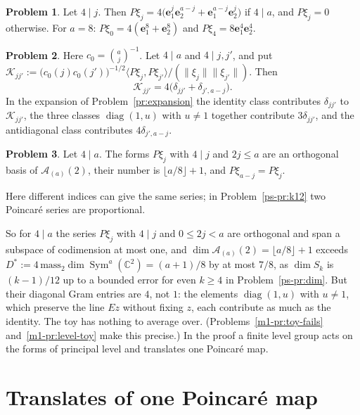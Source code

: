 \documentclass[reqno]{amsart}
\theoremstyle{definition}
\newtheorem{problem}{Problem}[section]
\theoremstyle{plain}
\theoremstyle{remark}
\newcommand{\C}{{\mathbb{C}}}
\newcommand{\Ac}{\mathcal A}
\newcommand{\Kc}{\mathcal K}
\newcommand{\be}{\mathbf e}
\newcommand{\Sym}{\operatorname{Sym}}
\newcommand{\diag}{\operatorname{diag}}
\begin{document}
\begin{problem}\label{pr:Pj}
Let \(4\mid j\).  Then \(P\xi_j=4\bigl(\be_1^j\be_2^{a-j}+\be_1^{a-j}\be_2^j\bigr)\) if \(4\mid a\), and \(P\xi_j=0\) otherwise.  For \(a=8\): \(P\xi_0=4(\be_1^8+\be_2^8)\) and \(P\xi_4=8\be_1^4\be_2^4\).
\end{problem}

\begin{problem}\label{pr:gram-toy}
Here \(c_0=\binom aj^{-1}\).  Let \(4\mid a\) and \(4\mid j,j'\), and put \(\Kc_{jj'}:=\bigl(c_0(j)c_0(j')\bigr)^{-1/2}\langle P\xi_j,P\xi_{j'}\rangle/(\lVert\xi_j\rVert\lVert\xi_{j'}\rVert)\).  Then
\[
 \Kc_{jj'}=4\bigl(\delta_{jj'}+\delta_{j',a-j}\bigr).
\]
In the expansion of Problem~\ref{pr:expansion} the identity class contributes \(\delta_{jj'}\) to \(\Kc_{jj'}\), the three classes \(\diag(1,u)\) with \(u\ne1\) together contribute \(3\delta_{jj'}\), and the antidiagonal class contributes \(4\delta_{j',a-j}\).
\end{problem}

\begin{problem}\label{pr:basis}
Let \(4\mid a\).  The forms \(P\xi_j\) with \(4\mid j\) and \(2j\le a\) are an orthogonal basis of \(\Ac_{(a)}(2)\), their number is \(\lfloor a/8\rfloor+1\), and \(P\xi_{a-j}=P\xi_j\).
\end{problem}

Here different indices can give the same series; in Problem~\ref{ps-pr:k12} two Poincar\'e series are proportional.

So for \(4\mid a\) the series \(P\xi_j\) with \(4\mid j\) and \(0\le2j<a\) are orthogonal and span a subspace of codimension at most one, and \(\dim\Ac_{(a)}(2)=\lfloor a/8\rfloor+1\) exceeds \(D^*:=4\,\mathrm{mass}_2\dim\Sym^a(\C^2)=(a+1)/8\) by at most \(7/8\), as \(\dim S_k\) is \((k-1)/12\) up to a bounded error for even \(k\ge4\) in Problem~\ref{ps-pr:dim}.  But their diagonal Gram entries are \(4\), not \(1\): the elements \(\diag(1,u)\) with \(u\ne1\), which preserve the line \(Ez\) without fixing \(z\), each contribute as much as the identity.  The toy has nothing to average over.  (Problems~\ref{m1-pr:toy-fails} and~\ref{m1-pr:level-toy} make this precise.)  In the proof a finite level group acts on the forms of principal level and translates one Poincar\'e map.

\section{Translates of one Poincar\'e map}\label{sec:gram}
\end{document}
